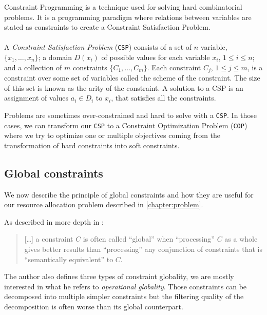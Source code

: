 \documentclass[../../thesis.tex]{subfiles}
\begin{document}
Constraint Programming is a technique used for solving hard combinatorial problems. It is a programming paradigm 
where relations between variables are stated as constraints to create a Constraint Satisfaction Problem.

\paragraph{}

A \emph{Constraint Satisfaction Problem} (\texttt{CSP}) consists of a set of $n$ variable, 
$\{x_1, \dots, x_n \}$; a domain $D(x_i)$ of possible values for each variable $x_i$, 
$1 \leq i \leq n$; and a collection of $m$ constraints $\{ C_1, \dots, C_m \}$. 
Each constraint $C_j$, $1 \leq j \leq m$, is a constraint over some set of variables called the scheme 
of the constraint. The size of this set is known as the arity of the constraint. 
A solution to a CSP is an assignment of values $a_i \in D_i$ to $x_i$, that satisfies all the constraints. \cite{cp-definition}

Problems are sometimes over-constrained and hard to solve with a \texttt{CSP}. In those cases, we can transform our 
\texttt{CSP} to a Constraint Optimization Problem (\texttt{COP}) where we try to optimize one or multiple objectives coming 
from the transformation of hard constraints into soft constraints.

\subsection{Global constraints}


We now describe the principle of global constraints and how they are useful for our resource allocation problem 
described in \autoref{chapter:problem}.

As described in more depth in \cite{Hentenryck:2003}: 

\begin{quotation}
  [\dots] a constraint $C$ is often called “global” when “processing” $C$ as a whole gives better results than “processing” any conjunction
  of constraints that is “semantically equivalent” to $C$.
\end{quotation}

The author also defines three types of constraint globality, we are mostly interested in what he refers to \emph{operational globality}. 
Those constraints can be decomposed into multiple simpler constraints but the filtering quality of the decomposition
is often worse than its global counterpart. 
\end{document}

